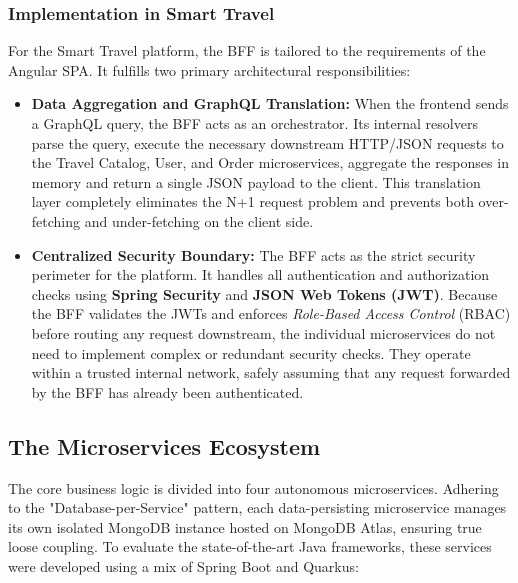 \subsubsection{Implementation in Smart Travel}

For the Smart Travel platform, the BFF is tailored to the requirements of the Angular \gls{SPA}. It fulfills two primary architectural responsibilities:

\begin{itemize}
    \item \textbf{Data Aggregation and GraphQL Translation:} When the frontend sends a GraphQL query, the BFF acts as an orchestrator. Its internal resolvers parse the query, execute the necessary downstream HTTP/JSON requests to the Travel Catalog, User, and Order microservices, aggregate the responses in memory and return a single JSON payload to the client. This translation layer completely eliminates the N+1 request problem and prevents both over-fetching and under-fetching on the client side.
    
    \item \textbf{Centralized Security Boundary:} The BFF acts as the strict security perimeter for the platform. It handles all authentication and authorization checks using \textbf{Spring Security} and \textbf{JSON Web Tokens (JWT)}. Because the BFF validates the JWTs and enforces \textit{Role-Based Access Control} (\gls{RBAC}) before routing any request downstream, the individual microservices do not need to implement complex or redundant security checks. They operate within a trusted internal network, safely assuming that any request forwarded by the BFF has already been authenticated.
\end{itemize}

\subsection{The Microservices Ecosystem}

The core business logic is divided into four autonomous microservices. Adhering to the "Database-per-Service" pattern, each data-persisting microservice manages its own isolated MongoDB instance hosted on MongoDB Atlas, ensuring true loose coupling. To evaluate the state-of-the-art Java frameworks, these services were developed using a mix of Spring Boot and Quarkus:


